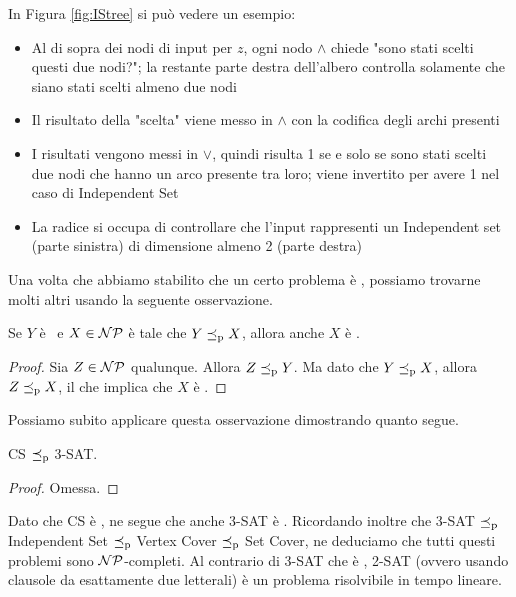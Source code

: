 In Figura \ref{fig:IStree} si può vedere un esempio:
\begin{itemize}
    \item Al di sopra dei nodi di input per $z$, ogni nodo $\wedge$ chiede "sono stati scelti questi due nodi?"; la restante parte destra dell'albero controlla solamente che siano stati scelti almeno due nodi

    \item Il risultato della "scelta" viene messo in $\wedge$ con la codifica degli archi presenti

    \item I risultati vengono messi in $\vee$, quindi risulta 1 se e solo se sono stati scelti due nodi che hanno un arco presente tra loro; viene invertito per avere 1 nel caso di Independent Set

    \item La radice si occupa di controllare che l'input rappresenti un Independent set (parte sinistra) di dimensione almeno 2 (parte destra)
\end{itemize}

Una volta che abbiamo stabilito che un certo problema è \NPc, possiamo trovarne molti altri usando la seguente osservazione. \\

\begin{fact}
    Se $Y$ è \NPc\ e $X \in \mathcal{NP}$ è tale che $Y \preceq_\text{p} X$, allora anche $X$ è \NPc.
\end{fact}
\begin{proof}
    Sia $Z \in \mathcal{NP}$ qualunque. Allora $Z \preceq_\text{p} Y$. Ma dato che $Y \preceq_\text{p} X$, allora $Z \preceq_\text{p} X$, il che implica che $X$ è \NPc.
\end{proof}

Possiamo subito applicare questa osservazione dimostrando quanto segue. \\

\begin{theorem}
    CS $\preceq_\text{p}$ 3-SAT.
\end{theorem}
\begin{proof}
    Omessa.
\end{proof}

Dato che CS è \NPc, ne segue che anche 3-SAT è \NPc. Ricordando inoltre che 3-SAT $\preceq_\text{p}$ Independent Set $\preceq_\text{p}$ Vertex Cover $\preceq_\text{p}$ Set Cover, ne deduciamo che tutti questi problemi sono $\mathcal{NP}$-completi. Al contrario di 3-SAT che è \NPc, 2-SAT (ovvero usando clausole da esattamente due letterali) è un problema risolvibile in tempo lineare.

